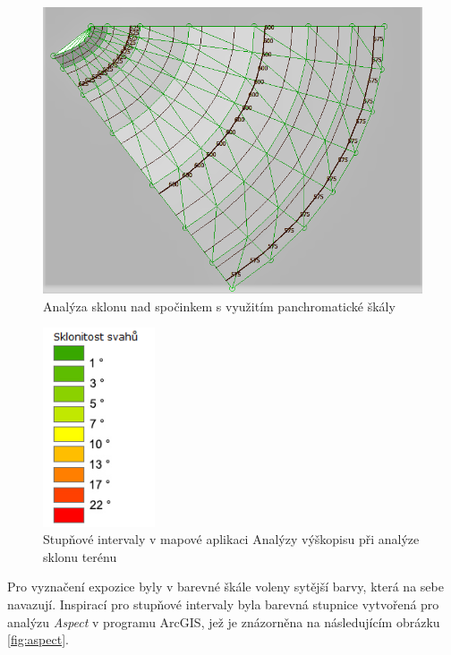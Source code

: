 \documentclass[a4paper,11pt,twoside]{article}
\begin{document}
\begin{figure}[hbt!] 
\begin{center}
\includegraphics[width=12cm]{pictures/gentle_ridge_panchromatic_slope.PNG} 
\caption[Analýza sklonu nad spočinkem s využitím panchromatické škály]{Analýza sklonu nad spočinkem s využitím panchromatické škály}
\label{fig:gentle_ridge_panchromatic_slope}
\end{center}
\end{figure}


\begin{figure}[hbt!] 
\begin{center}
\includegraphics[width=3.3cm]{pictures/analyzy_slope.PNG} 
\caption[Stupňové intervaly v mapové aplikaci Analýzy výškopisu při analýze sklonu terénu ]{Stupňové intervaly v mapové aplikaci Analýzy výškopisu při analýze sklonu terénu}
\label{fig:analyzy_slope}
\end{center}
\end{figure}

\newpage
Pro vyznačení expozice byly v barevné škále voleny sytější barvy, která na sebe navazují. Inspirací pro stupňové intervaly byla barevná stupnice vytvořená pro analýzu \textit{Aspect} v programu ArcGIS, jež je znázorněna na následujícím obrázku \ref{fig:aspect}. 
\end{document}
